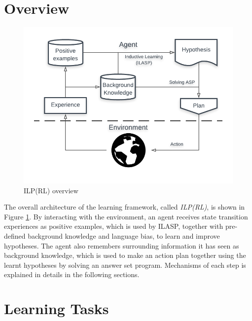 \section{Overview}
\label{sec:overview}

\begin{figure}[!htb]
\centering
\includegraphics[width=1.0\textwidth]{./figures/architecture}
\caption{ILP(RL) overview}
\label{fig:ILPRL_overview}
\end{figure}

The overall architecture of the learning framework, called \textit{ILP(RL)}, is shown in Figure \ref{fig:ILPRL_overview}. 
By interacting with the environment, an agent receives state transition experiences as positive examples, which is used by ILASP, together with pre-defined background knowledge and language bias, to learn and improve hypotheses.
The agent also remembers surrounding information it has seen as background knowledge, which is used to make an action plan together using the learnt hypotheses by solving an answer set program.
Mechanisms of each step is explained in details in the following sections.

\section{Learning Tasks}
\label{sec:learning_tasks}


